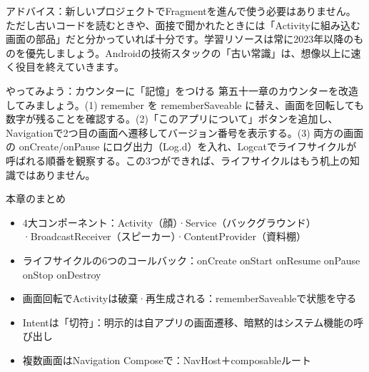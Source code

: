 アドバイス：新しいプロジェクトでFragmentを進んで使う必要はありません。ただし古いコードを読むときや、面接で聞かれたときには「Activityに組み込む画面の部品」だと分かっていれば十分です。学習リソースは常に2023年以降のものを優先しましょう。Androidの技術スタックの「古い常識」は、想像以上に速く役目を終えていきます。

\begin{tcbpractice}{やってみよう：カウンターに「記憶」をつける}
第五十一章のカウンターを改造してみましょう。(1) remember を rememberSaveable に替え、画面を回転しても数字が残ることを確認する。(2)「このアプリについて」ボタンを追加し、Navigationで2つ目の画面へ遷移してバージョン番号を表示する。(3) 両方の画面の onCreate/onPause にログ出力（Log.d）を入れ、Logcatでライフサイクルが呼ばれる順番を観察する。この3つができれば、ライフサイクルはもう机上の知識ではありません。

\end{tcbpractice}

\begin{tcbsummary}{本章のまとめ}
\begin{itemize}
  \item 4大コンポーネント：Activity（顔）·Service（バックグラウンド）·BroadcastReceiver（スピーカー）·ContentProvider（資料棚）
  \item ライフサイクルの6つのコールバック：onCreate onStart onResume onPause onStop onDestroy
  \item 画面回転でActivityは破棄·再生成される：rememberSaveableで状態を守る
  \item Intentは「切符」：明示的は自アプリの画面遷移、暗黙的はシステム機能の呼び出し
  \item 複数画面はNavigation Composeで：NavHost＋composableルート
\end{itemize}

\end{tcbsummary}
